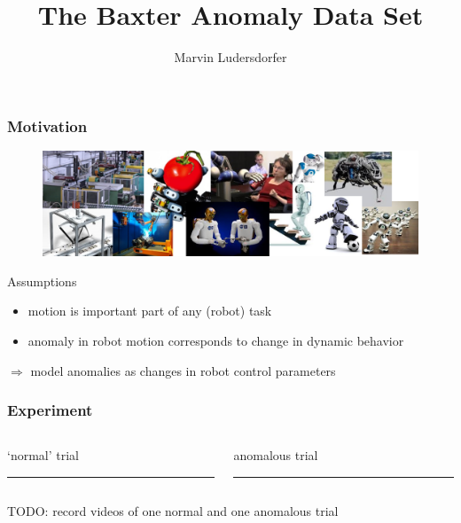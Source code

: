 \documentclass[%
USenglish,%
pdftex,%
compress,%
10pt,%
svgnames%
,handout
]
{beamer}
\begin{document}

\title{The Baxter Anomaly Data Set}
\author{Marvin Ludersdorfer}

\date{}

\frame{\titlepage}
\begin{frame}
	\frametitle{Motivation}
    \begin{figure}
        \centering
        \includegraphics[width=\textwidth]{figs/robots}
    \end{figure}
    
    \vfill
    \begin{block}{Assumptions}
        \begin{itemize}
            \item motion is important part of any (robot) task
            \item anomaly in robot motion corresponds to change in dynamic behavior
        \end{itemize}
        $\Rightarrow$ model anomalies as changes in robot control parameters
	\end{block}
\end{frame}

\begin{frame}
	\frametitle{Experiment}
	\begin{columns}[onlytextwidth]
        \begin{column}{.5\textwidth}
        \begin{block}{`normal' trial}
            \rule{.9\columnwidth}{3cm}
        \end{block}
        \end{column}
        \begin{column}{.5\textwidth}
        \begin{block}{anomalous trial}
            \rule{.9\columnwidth}{3cm}
        \end{block}
        \end{column}
    \end{columns}
    TODO: record videos of one normal and one anomalous trial
\end{frame}
\end{document}

